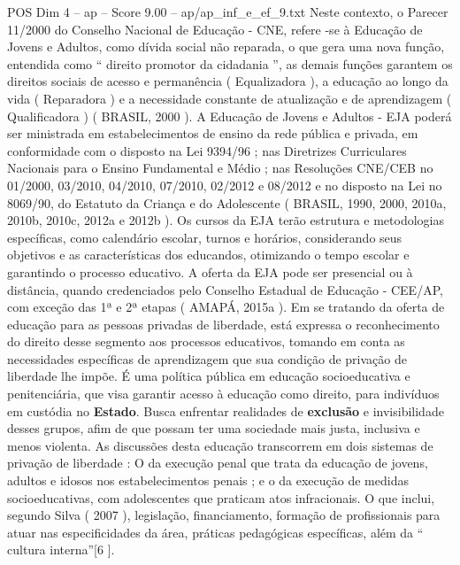 \begin{textsample}{POS Dim 4 – ap – Score 9.00 – ap/ap\_inf\_e\_ef\_9.txt}
Neste contexto, o Parecer 11/2000 do Conselho Nacional de Educação - CNE, refere -se à Educação de Jovens e Adultos, como dívida social não reparada, o que gera uma nova função, entendida como “ direito promotor da cidadania ”, as demais funções garantem os direitos sociais de acesso e permanência ( Equalizadora ), a educação ao longo da vida ( Reparadora ) e a necessidade constante de atualização e de aprendizagem ( Qualificadora ) ( BRASIL, 2000 ).
A Educação de Jovens e Adultos - EJA poderá ser ministrada em estabelecimentos de ensino da rede pública e privada, em conformidade com o disposto na Lei 9394/96 ; nas Diretrizes Curriculares Nacionais para o Ensino Fundamental e Médio ; nas Resoluções CNE/CEB no 01/2000, 03/2010, 04/2010, 07/2010, 02/2012 e 08/2012 e no disposto na Lei no 8069/90, do Estatuto da Criança e do Adolescente ( BRASIL, 1990, 2000, 2010a, 2010b, 2010c, 2012a e 2012b ).
Os cursos da EJA terão estrutura e metodologias específicas, como calendário escolar, turnos e horários, considerando seus objetivos e as características dos educandos, otimizando o tempo escolar e garantindo o processo educativo.
A oferta da EJA pode ser presencial ou à distância, quando credenciados pelo Conselho Estadual de Educação - CEE/AP, com exceção das 1ª e 2ª etapas ( AMAPÁ, 2015a ).
Em se tratando da oferta de educação para as pessoas privadas de liberdade, está expressa o reconhecimento do direito desse segmento aos processos educativos, tomando em conta as necessidades específicas de aprendizagem que sua condição de privação de liberdade lhe impõe.
É uma política pública em educação socioeducativa e penitenciária, que visa garantir acesso à educação como direito, para indivíduos em custódia no \textbf{Estado}.
Busca enfrentar realidades de \textbf{exclusão} e invisibilidade desses grupos, afim de que possam ter uma sociedade mais justa, inclusiva e menos violenta.
As discussões desta educação transcorrem em dois sistemas de privação de liberdade : O da execução penal que trata da educação de jovens, adultos e idosos nos estabelecimentos penais ; e o da execução de medidas socioeducativas, com adolescentes que praticam atos infracionais.
O que inclui, segundo Silva ( 2007 ), legislação, financiamento, formação de profissionais para atuar nas especificidades da área, práticas pedagógicas específicas, além da “ cultura interna”[6 ].

\end{textsample}
